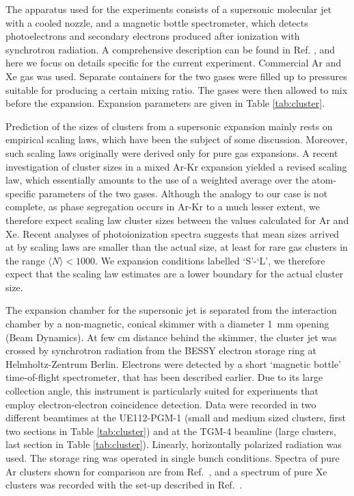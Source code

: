 %
%
The apparatus used for the experiments consists of a supersonic molecular jet with a cooled nozzle, and a magnetic bottle spectrometer, which detects photoelectrons and secondary electrons produced after ionization with synchrotron radiation.\cite{arion} 
A comprehensive description can be found in Ref. , and here we focus on details specific for the current experiment. Commercial Ar and Xe gas was used. 
Separate containers for the two gases were filled up to pressures suitable for producing a certain mixing ratio. The gases were then allowed to mix before the expansion. 
Expansion parameters are given in Table \ref{tab:cluster}.

Prediction of the sizes of clusters from a supersonic expansion mainly rests on empirical scaling laws,\cite{hagena1981} which have been the subject of some discussion.
Moreover, such scaling laws originally were derived only for pure gas expansions.
A recent investigation of cluster sizes in a mixed Ar-Kr expansion yielded a revised scaling law, which essentially amounts to the use of a weighted average over the atom-specific parameters of the two gases.\cite{danylchenko2015} 
Although the analogy to our case is not complete, as phase segregation occurs in Ar-Kr to a much lesser extent,\cite{Vach_1999,lundwall_arkr} we therefore expect scaling law cluster sizes between the values calculated for Ar and Xe.
Recent analyses of photoionization spectra suggests that mean sizes arrived at by scaling laws are smaller than the actual size, at least for rare gas clusters in the range $\langle N\rangle < 1000$.\cite{bergersen,hergenhahnprb,foerstel_arg2_2011}
We expansion conditions labelled `S'-`L', we therefore expect that the scaling law estimates are a lower boundary for the actual cluster size.

The expansion chamber for the supersonic jet is separated from the interaction chamber by a non-magnetic, conical skimmer with a diameter 1~mm opening (Beam Dynamics). 
At few cm distance behind the skimmer, the cluster jet was crossed by synchrotron radiation from the BESSY electron storage ring at Helmholtz-Zentrum Berlin. 
Electrons were detected by a short `magnetic bottle' time-of-flight spectrometer, that has been described earlier.\cite{mucke_review}
Due to its large collection angle, this instrument is particularly suited for experiments that employ electron-electron coincidence detection.
Data were recorded in two different beamtimes at the UE112-PGM-1 (small and medium sized clusters, first two sections in Table \ref{tab:cluster}) and at the TGM-4 beamline (large clusters, last section in Table \ref{tab:cluster}). 
Linearly, horizontally polarized radiation was used. 
The storage ring was operated in single bunch conditions.
Spectra of pure Ar clusters shown for comparison are from Ref.\ , and a spectrum of pure Xe clusters was recorded with the set-up described in Ref.\ .

